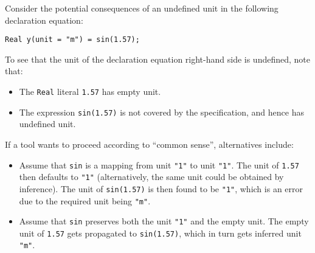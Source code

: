 \begin{example}
Consider the potential consequences of an undefined unit in the following declaration equation:
\begin{lstlisting}[language=modelica]
Real y(unit = "m") = sin(1.57);
\end{lstlisting}
To see that the unit of the declaration equation right-hand side is undefined, note that:
\begin{itemize}
\item The \lstinline!Real! literal \lstinline!1.57! has empty unit.
\item The expression \lstinline!sin(1.57)! is not covered by the specification, and hence has undefined unit.
\end{itemize}
If a tool wants to proceed according to ``common sense'', alternatives include:
\begin{itemize}
\item
  Assume that \lstinline!sin! is a mapping from unit \lstinline!"1"! to unit \lstinline!"1"!.
  The unit of \lstinline!1.57! then defaults to \lstinline!"1"! (alternatively, the same unit could be obtained by inference).
  The unit of \lstinline!sin(1.57)! is then found to be \lstinline!"1"!, which is an error due to the required unit being \lstinline!"m"!.
\item
  Assume that \lstinline!sin! preserves both the unit \lstinline!"1"! and the empty unit.
  The empty unit of \lstinline!1.57! gets propagated to \lstinline!sin(1.57)!, which in turn gets inferred unit \lstinline!"m"!.
\end{itemize}
\end{example}
